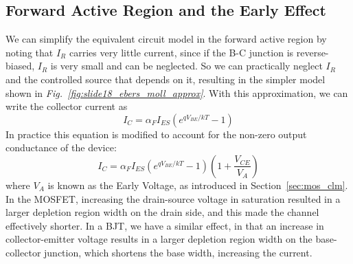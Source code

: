 \subsection{Forward Active Region and the Early Effect}
We can simplify the equivalent circuit model in the forward active region by noting that $I_R$ carries very little current, since if the B-C junction is reverse-biased, $I_R$ is very small and can be neglected.  So we can practically neglect $I_R$ and the controlled source that depends on it, resulting in the simpler model shown in \emph{Fig.~\ref{fig:slide18_ebers_moll_approx}}.
With this approximation, we can write the collector current as
    \begin{equation}
        I_C = \alpha_F I_{ES} \left( e^{qV_{BE}/kT} -1 \right)
    \end{equation}
In practice this equation is modified to account for the non-zero output conductance of the device:
    \begin{equation}
        I_C = \alpha_F I_{ES} \left( e^{qV_{BE}/kT} -1 \right) \left( 1 + \frac{V_{CE}}{V_A} \right)
    \end{equation}
where $V_A$ is known as the Early Voltage, as introduced in Section~\ref{sec:mos_clm}.  In the MOSFET, increasing the drain-source voltage in saturation resulted in a larger depletion region width on the drain side, and this made the channel effectively shorter.  In a BJT, we have a similar effect, in that an increase in collector-emitter voltage results in a larger depletion region width on the base-collector junction, which shortens the base width, increasing the current.
